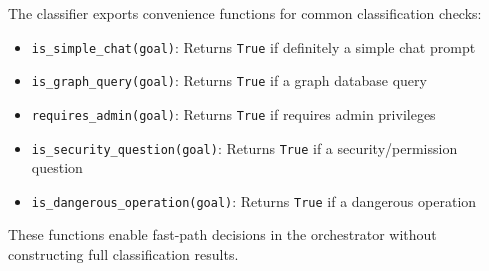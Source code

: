 The classifier exports convenience functions for common classification checks:

\begin{itemize}
    \item \texttt{is\_simple\_chat(goal)}: Returns \texttt{True} if definitely a simple chat prompt
    \item \texttt{is\_graph\_query(goal)}: Returns \texttt{True} if a graph database query
    \item \texttt{requires\_admin(goal)}: Returns \texttt{True} if requires admin privileges
    \item \texttt{is\_security\_question(goal)}: Returns \texttt{True} if a security/permission question
    \item \texttt{is\_dangerous\_operation(goal)}: Returns \texttt{True} if a dangerous operation
\end{itemize}

These functions enable fast-path decisions in the orchestrator without constructing full classification results.


